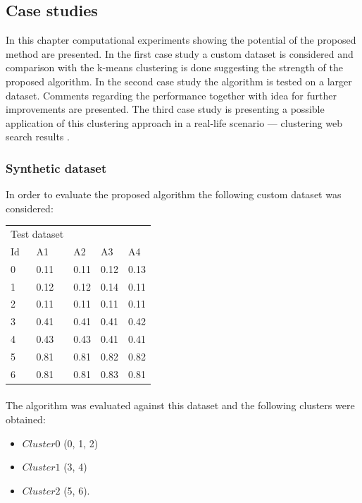 \subsection{Case studies}
\label{sec:caseasm}

In this chapter computational experiments showing the potential of the proposed method are presented. In the first case study a custom dataset is considered and comparison with the k-means clustering is done suggesting the strength of the proposed algorithm. In the second case study the algorithm is tested on a larger dataset. Comments regarding the performance together with idea for further improvements are presented. The third case study is presenting a possible application of this clustering approach in a real-life scenario --- clustering web search results \cite{Gaceanu10AnAdaptive}.

\subsubsection{Synthetic dataset}

In order to evaluate the proposed algorithm the following custom dataset was considered:

\begin{tabular}{lllll}
\hline
\multicolumn{2}{c}{Test dataset} \\
\cline{1-5}
Id  & A1 & A2 & A3 & A4  \\ 
\hline
0 & 0.11 & 0.11 & 0.12 & 0.13\\
1 & 0.12 & 0.12 & 0.14 & 0.11\\
2 & 0.11 & 0.11 & 0.11 & 0.11\\
3 & 0.41 & 0.41 & 0.41 & 0.42\\
4 & 0.43 & 0.43 & 0.41 & 0.41\\
5 & 0.81 & 0.81 & 0.82 & 0.82\\
6 & 0.81 & 0.81 & 0.83 & 0.81\\
\hline
\end{tabular} 

\begin{align*}
\end{align*}
The algorithm was evaluated against this dataset and the following clusters were obtained:
\begin{itemize}
\item $Cluster0$ (0, 1, 2)
\item $Cluster1$ (3, 4) 
\item $Cluster2$ (5, 6). 
\end{itemize}

